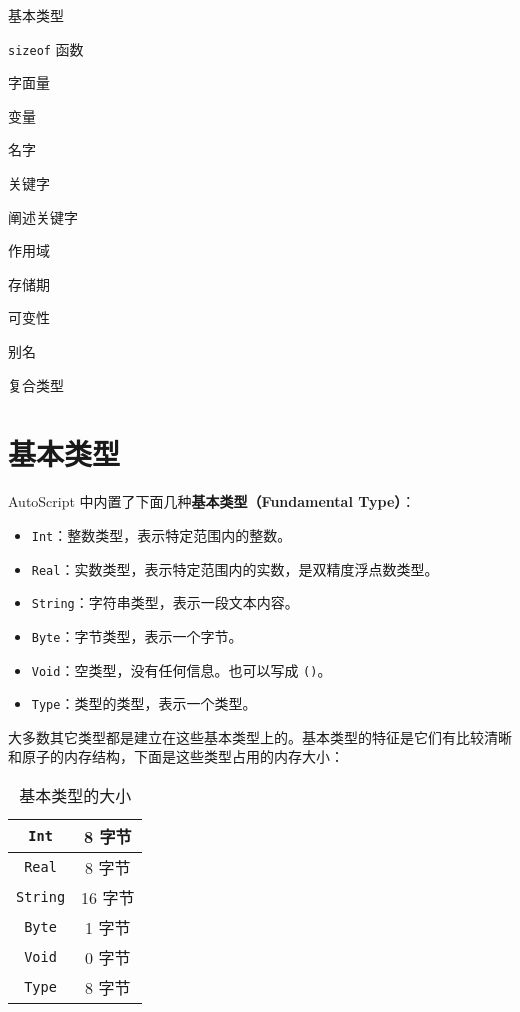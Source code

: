 \begin{introduction}
    \item 基本类型
    \item \lstinline!sizeof! 函数
    \item 字面量
    \item 变量
    \item 名字
    \item 关键字
    \item 阐述关键字
    \item 作用域
    \item 存储期
    \item 可变性
    \item 别名
    \item 复合类型
\end{introduction}


\section{基本类型}

AutoScript 中内置了下面几种\textbf{基本类型（Fundamental Type）}：

\begin{itemize}
    \item \lstinline!Int!：整数类型，表示特定范围内的整数。
    \item \lstinline!Real!：实数类型，表示特定范围内的实数，是双精度浮点数类型。
    \item \lstinline!String!：字符串类型，表示一段文本内容。
    \item \lstinline!Byte!：字节类型，表示一个字节。
    \item \lstinline!Void!：空类型，没有任何信息。也可以写成 \lstinline!()!。
    \item \lstinline!Type!：类型的类型，表示一个类型。
\end{itemize}

大多数其它类型都是建立在这些基本类型上的。基本类型的特征是它们有比较清晰和原子的内存结构，下面是这些类型占用的内存大小：

\begin{table}[h]
    \centering
    \begin{tabular}{|c|c|} \hline
        \lstinline!Int! & 8 字节  \\\hline
        \lstinline!Real! & 8 字节 \\\hline 
        \lstinline!String! & 16 字节 \\\hline
        \lstinline!Byte! & 1 字节 \\\hline
        \lstinline!Void! & 0 字节 \\\hline
        \lstinline!Type! & 8 字节 \\\hline
    \end{tabular}
    \caption{基本类型的大小}
    \label{tab:sizeof-fundamental-type}
\end{table}

